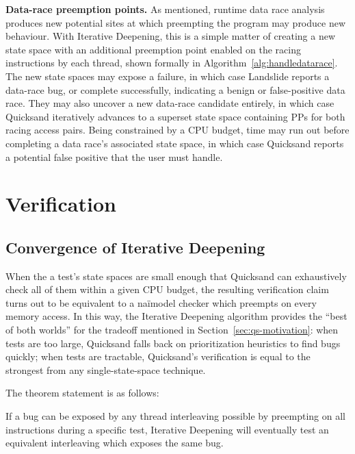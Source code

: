 {\bf Data-race preemption points.}
As mentioned, runtime data race analysis produces new potential sites at which preempting the program may produce new behaviour.
With Iterative Deepening, this is a simple matter of creating a new state space with an additional preemption point enabled on the racing instructions by each thread, shown formally in Algorithm~\ref{alg:handledatarace}.
The new state spaces may expose a failure, in which case Landslide reports a data-race bug,
or complete successfully, indicating a benign or false-positive data race.
They may also uncover a new data-race candidate entirely, %
in which case Quicksand iteratively advances to a superset state space containing PPs for both racing access pairs.
Being constrained by a CPU budget,
time may run out before completing a data race's associated state space,
in which case Quicksand reports a potential false positive that the user must handle.


\section{Verification}

\subsection{Convergence of Iterative Deepening}
When the a test's state spaces are small enough that Quicksand can exhaustively check all of them within a given CPU budget,
the resulting verification claim turns out to be equivalent to a na\"{i}model checker which preempts on every memory access.
In this way, the Iterative Deepening algorithm provides the ``best of both worlds'' for the tradeoff mentioned in Section~\ref{sec:qs-motivation}:
when tests are too large, Quicksand falls back on prioritization heuristics to find bugs quickly;
when tests are tractable, Quicksand's verification is equal to the strongest from any single-state-space technique.

The theorem statement is as follows:

\begin{theorem}[Convergence]
	If a bug can be exposed by any
thread interleaving possible by preempting on all instructions during a specific test, Iterative Deepening will eventually test an equivalent interleaving which exposes the same bug.
\end{theorem}

